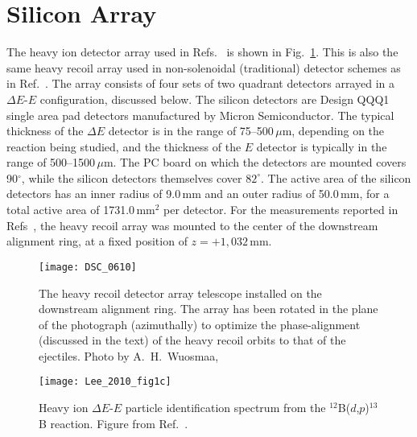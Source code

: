\section{Silicon Array}
The heavy ion detector array used in Refs.~\cite{Schiffer_2010,Wuosmaa_2010} is shown in Fig.~\ref{recoil}. This is also the same heavy recoil array used in non-solenoidal (traditional) detector schemes as in Ref.~\cite{Lee_2010}.  The array consists of four sets of two quadrant detectors arrayed in a $\Delta E$-$E$ configuration, discussed below.  The silicon detectors are Design QQQ1 single area pad detectors manufactured by Micron Semiconductor.  The typical thickness of the $\Delta E$ detector is in the range of 75--500\,$\mu$m, depending on the reaction being studied, and the thickness of the $E$ detector is typically in the range of 500--1500\,$\mu$m.  The PC board on which the detectors are mounted covers 90$^\circ$, while the silicon detectors themselves cover $82^\circ$.  The active area of the silicon detectors has an inner radius of 9.0\,mm and an outer radius of 50.0\,mm, for a total active area of 1731.0\,mm$^2$ per detector.  For the measurements reported in Refs~\cite{Schiffer_2010,Wuosmaa_2010}, the heavy recoil array was mounted to the center of the downstream alignment ring, %
at a fixed position of $z=+1,032$\,mm.

\begin{figure}[ht]
\texttt{[image: DSC\_0610]}%
\caption[The heavy recoil detector array telescope installed on the downstream alignment ring]{The heavy recoil detector array telescope installed on the downstream alignment ring.  The array has been rotated in the plane of the photograph (azimuthally) to optimize the phase-alignment (discussed in the text) of the heavy recoil orbits to that of the ejectiles.  Photo by A.~H.\ Wuosmaa, \photodate{}}
\label{recoil}%
\end{figure}

\begin{figure}
\centering
\texttt{[image: Lee\_2010\_fig1c]}%
\caption[Heavy ion $\Delta E$-$E$ particle identification spectrum from the $^{12}$B($d$,$p$)$^{13}$B reaction]{Heavy ion $\Delta E$-$E$ particle identification spectrum from the $^{12}$B($d$,$p$)$^{13}$B reaction.  Figure from Ref.~\cite[Fig.~1(c)]{Lee_2010}.}%
\label{B12_PID}%
\end{figure}

